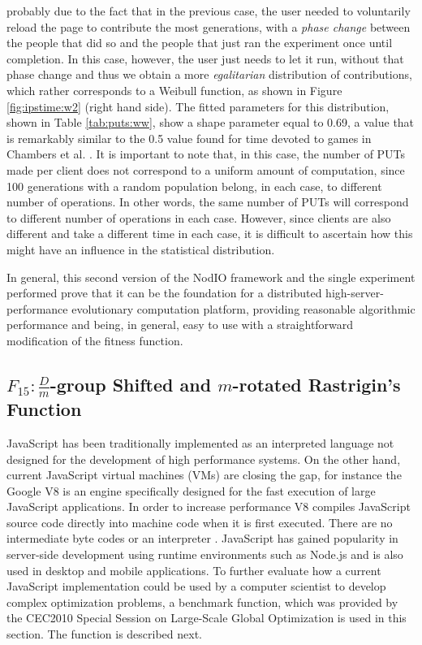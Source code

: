 \documentclass[journal,onecolumn]{IEEEtran}
\begin{document}
probably due to the fact that in the previous case, the user needed to
voluntarily reload the page to contribute the most generations, with a
{\em phase change} between the people that did so and the people that
just ran the experiment once until completion. In this case, however, the
user just needs to let it run, without that phase change and thus we obtain a
more {\em egalitarian} distribution of contributions, which rather
corresponds to a Weibull function, as shown in Figure
\ref{fig:ipstime:w2} (right hand side). The fitted parameters for this
distribution, shown in Table \ref{tab:puts:ww}, show a shape parameter
equal to 0.69, a value that is remarkably similar to the 0.5 value
found for time devoted to games in Chambers et
al. \cite{chambers2005measurement}. It is important to note that, in
this case, the number of PUTs made per client does not correspond to a
uniform amount of computation, since 100 generations with a random
population belong, in each case, to different number of
operations. In other words, the same number of PUTs will correspond to
different number of operations in each case. However, since clients
are also different and take a different time in each case, it is
difficult to ascertain how this might have an influence in the
statistical distribution.

In general, this second version of the {\sf NodIO} framework and the
single experiment performed prove that it can be the foundation for a distributed
high-server-performance evolutionary computation platform,
providing reasonable algorithmic performance and being, in general,
easy to use with a straightforward modification of the fitness
function. 


\subsection{$F_{15}:\frac{D}{m}$-group Shifted and $m$-rotated Rastrigin's Function}
JavaScript has been traditionally implemented as an interpreted
language not designed for the development of high performance
systems. On the other hand, current JavaScript  
virtual machines (VMs) are closing the gap, for instance the Google V8 
is an engine specifically designed for the fast execution of 
large JavaScript applications. In order to increase performance
V8 compiles JavaScript source code directly into machine code when it is first executed. 
There are no intermediate byte codes or an interpreter \cite{Gray:2009:GCM:1610564.1610565}.
JavaScript has gained popularity in server-side development using runtime
environments such as Node.js and is also used in desktop and mobile applications. 
To further evaluate how a current JavaScript implementation could be used by a
computer scientist to develop complex optimization problems,
a benchmark function, which was provided by the CEC2010 Special Session on
Large-Scale Global Optimization \cite{tang2007benchmark} is used in this section. 
The function is described next.
\end{document}
